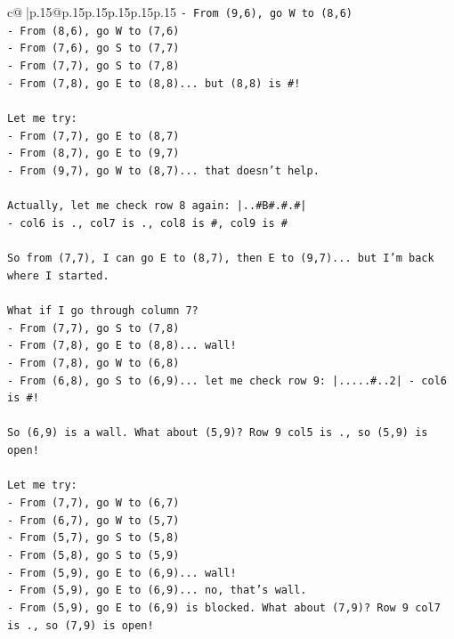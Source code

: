\documentclass{article}
\begin{document}
{\begin{supertabular}{c@{$\;$}|p{.15\linewidth}@{}p{.15\linewidth}p{.15\linewidth}p{.15\linewidth}p{.15\linewidth}p{.15\linewidth}}
{{{\texttt{{-} From (9,6), go W to (8,6)} \\
\texttt{{-} From (8,6), go W to (7,6)} \\
\texttt{{-} From (7,6), go S to (7,7)} \\
\texttt{{-} From (7,7), go S to (7,8)} \\
\texttt{{-} From (7,8), go E to (8,8)... but (8,8) is \#!} \\
\\ 
\texttt{Let me try:} \\
\texttt{{-} From (7,7), go E to (8,7)} \\
\texttt{{-} From (8,7), go E to (9,7)} \\
\texttt{{-} From (9,7), go W to (8,7)... that doesn't help.} \\
\\ 
\texttt{Actually, let me check row 8 again: |..\#B\#.\#.\#|} \\
\texttt{{-} col6 is ., col7 is ., col8 is \#, col9 is \#} \\
\\ 
\texttt{So from (7,7), I can go E to (8,7), then E to (9,7)... but I'm back where I started.} \\
\\ 
\texttt{What if I go through column 7?} \\
\texttt{{-} From (7,7), go S to (7,8)} \\
\texttt{{-} From (7,8), go E to (8,8)... wall!} \\
\texttt{{-} From (7,8), go W to (6,8)} \\
\texttt{{-} From (6,8), go S to (6,9)... let me check row 9: |.....\#..2| {-} col6 is \#!} \\
\\ 
\texttt{So (6,9) is a wall. What about (5,9)? Row 9 col5 is ., so (5,9) is open!} \\
\\ 
\texttt{Let me try:} \\
\texttt{{-} From (7,7), go W to (6,7)} \\
\texttt{{-} From (6,7), go W to (5,7)} \\
\texttt{{-} From (5,7), go S to (5,8)} \\
\texttt{{-} From (5,8), go S to (5,9)} \\
\texttt{{-} From (5,9), go E to (6,9)... wall!} \\
\texttt{{-} From (5,9), go E to (6,9)... no, that's wall.} \\
\texttt{{-} From (5,9), go E to (6,9) is blocked. What about (7,9)? Row 9 col7 is ., so (7,9) is open!} \\
}}}
\end{supertabular}}
\end{document}
